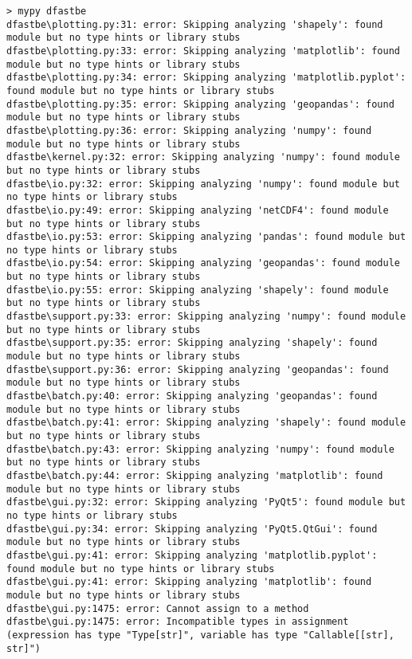 \begin{Verbatim}[fontsize=\tiny]
> mypy dfastbe
dfastbe\plotting.py:31: error: Skipping analyzing 'shapely': found module but no type hints or library stubs
dfastbe\plotting.py:33: error: Skipping analyzing 'matplotlib': found module but no type hints or library stubs
dfastbe\plotting.py:34: error: Skipping analyzing 'matplotlib.pyplot': found module but no type hints or library stubs
dfastbe\plotting.py:35: error: Skipping analyzing 'geopandas': found module but no type hints or library stubs
dfastbe\plotting.py:36: error: Skipping analyzing 'numpy': found module but no type hints or library stubs
dfastbe\kernel.py:32: error: Skipping analyzing 'numpy': found module but no type hints or library stubs
dfastbe\io.py:32: error: Skipping analyzing 'numpy': found module but no type hints or library stubs
dfastbe\io.py:49: error: Skipping analyzing 'netCDF4': found module but no type hints or library stubs
dfastbe\io.py:53: error: Skipping analyzing 'pandas': found module but no type hints or library stubs
dfastbe\io.py:54: error: Skipping analyzing 'geopandas': found module but no type hints or library stubs
dfastbe\io.py:55: error: Skipping analyzing 'shapely': found module but no type hints or library stubs
dfastbe\support.py:33: error: Skipping analyzing 'numpy': found module but no type hints or library stubs
dfastbe\support.py:35: error: Skipping analyzing 'shapely': found module but no type hints or library stubs
dfastbe\support.py:36: error: Skipping analyzing 'geopandas': found module but no type hints or library stubs
dfastbe\batch.py:40: error: Skipping analyzing 'geopandas': found module but no type hints or library stubs
dfastbe\batch.py:41: error: Skipping analyzing 'shapely': found module but no type hints or library stubs
dfastbe\batch.py:43: error: Skipping analyzing 'numpy': found module but no type hints or library stubs
dfastbe\batch.py:44: error: Skipping analyzing 'matplotlib': found module but no type hints or library stubs
dfastbe\gui.py:32: error: Skipping analyzing 'PyQt5': found module but no type hints or library stubs
dfastbe\gui.py:34: error: Skipping analyzing 'PyQt5.QtGui': found module but no type hints or library stubs
dfastbe\gui.py:41: error: Skipping analyzing 'matplotlib.pyplot': found module but no type hints or library stubs
dfastbe\gui.py:41: error: Skipping analyzing 'matplotlib': found module but no type hints or library stubs
dfastbe\gui.py:1475: error: Cannot assign to a method
dfastbe\gui.py:1475: error: Incompatible types in assignment (expression has type "Type[str]", variable has type "Callable[[str], str]")

\end{Verbatim}
